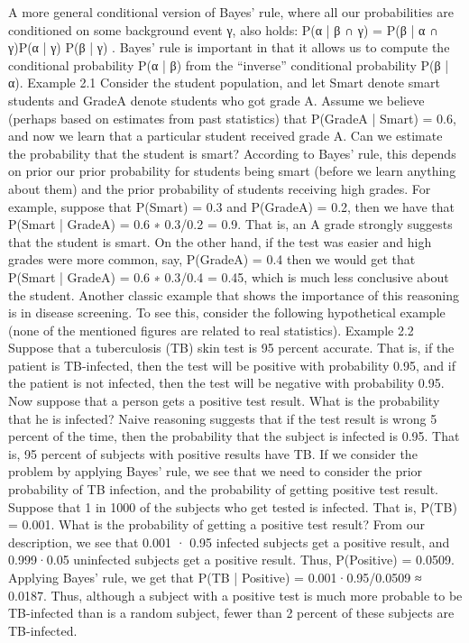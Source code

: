 A more general conditional version of Bayes’ rule, where all our probabilities are conditioned on some background event γ, also holds: P(α | β ∩ γ) = P(β | α ∩ γ)P(α | γ) P(β | γ) . Bayes’ rule is important in that it allows us to compute the conditional probability P(α | β) from the “inverse” conditional probability P(β | α). Example 2.1 Consider the student population, and let Smart denote smart students and GradeA denote students who got grade A. Assume we believe (perhaps based on estimates from past statistics) that P(GradeA | Smart) = 0.6, and now we learn that a particular student received grade A. Can we estimate the probability that the student is smart? According to Bayes’ rule, this depends on prior our prior probability for students being smart (before we learn anything about them) and the prior probability of students receiving high grades. For example, suppose that P(Smart) = 0.3 and P(GradeA) = 0.2, then we have that P(Smart | GradeA) = 0.6 ∗ 0.3/0.2 = 0.9. That is, an A grade strongly suggests that the student is smart. On the other hand, if the test was easier and high grades were more common, say, P(GradeA) = 0.4 then we would get that P(Smart | GradeA) = 0.6 ∗ 0.3/0.4 = 0.45, which is much less conclusive about the student. Another classic example that shows the importance of this reasoning is in disease screening. To see this, consider the following hypothetical example (none of the mentioned figures are related to real statistics). Example 2.2 Suppose that a tuberculosis (TB) skin test is 95 percent accurate. That is, if the patient is TB-infected, then the test will be positive with probability 0.95, and if the patient is not infected, then the test will be negative with probability 0.95. Now suppose that a person gets a positive test result. What is the probability that he is infected? Naive reasoning suggests that if the test result is wrong 5 percent of the time, then the probability that the subject is infected is 0.95. That is, 95 percent of subjects with positive results have TB. If we consider the problem by applying Bayes’ rule, we see that we need to consider the prior probability of TB infection, and the probability of getting positive test result. Suppose that 1 in 1000 of the subjects who get tested is infected. That is, P(TB) = 0.001. What is the probability of getting a positive test result? From our description, we see that 0.001 · 0.95 infected subjects get a positive result, and 0.999·0.05 uninfected subjects get a positive result. Thus, P(Positive) = 0.0509. Applying Bayes’ rule, we get that P(TB | Positive) = 0.001·0.95/0.0509 ≈ 0.0187. Thus, although a subject with a positive test is much more probable to be TB-infected than is a random subject, fewer than 2 percent of these subjects are TB-infected.

